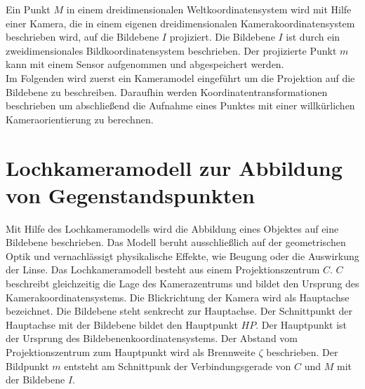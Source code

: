 Ein Punkt $M$ in einem dreidimensionalen Weltkoordinatensystem wird mit Hilfe einer Kamera, die in einem eigenen dreidimensionalen Kamerakoordinatensystem beschrieben wird, auf die Bildebene $I$ projiziert. Die Bildebene $I$ ist durch ein zweidimensionales Bildkoordinatensystem beschrieben. Der projizierte Punkt $m$ kann mit einem Sensor aufgenommen und abgespeichert werden.  \\ 

Im Folgenden wird zuerst ein Kameramodel eingeführt um die Projektion auf die Bildebene zu beschreiben. Daraufhin werden Koordinatentransformationen beschrieben um abschließend die Aufnahme eines Punktes mit einer willkürlichen Kameraorientierung zu berechnen. 


\section{Lochkameramodell zur Abbildung von Gegenstandspunkten}

Mit Hilfe des Lochkameramodells wird die Abbildung eines Objektes auf eine Bildebene beschrieben. Das Modell beruht ausschließlich auf der geometrischen Optik und vernachlässigt physikalische Effekte, wie Beugung oder die Auswirkung der Linse\cite{Heipke}. Das Lochkameramodell besteht aus einem Projektionszentrum $C$. $C$ beschreibt gleichzeitig die Lage des Kamerazentrums und bildet den Ursprung des Kamerakoordinatensystems\cite{CamerModels.,HZ}. Die Blickrichtung der Kamera wird als Hauptachse bezeichnet. Die Bildebene steht senkrecht zur Hauptachse. Der Schnittpunkt der Hauptachse mit der Bildebene bildet den Hauptpunkt $HP$. Der Hauptpunkt ist der Ursprung des Bildebenenkoordinatensystems. Der Abstand vom Projektionszentrum zum Hauptpunkt wird als Brennweite $\zeta$ beschrieben\cite{HZ,CamerModels.}. Der Bildpunkt $m$ entsteht am Schnittpunk der Verbindungsgerade von $C$ und $M$ mit der Bildebene $I$. 



